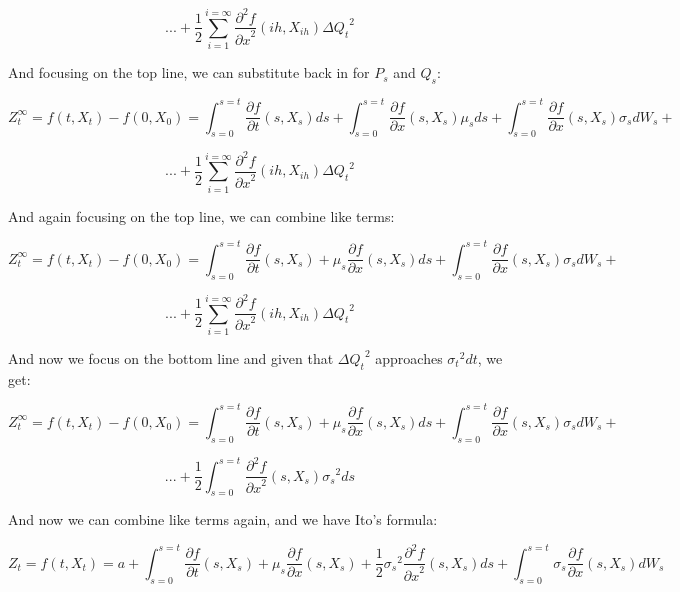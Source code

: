 \documentclass{article}
\begin{document}
$$...  +  \frac{1}{2}\sum_{i=1}^{i = \infty}\frac{\partial^2 f}{{\partial x}^2}(ih,X_{ih}){\Delta Q_t}^2 $$

And focusing on the top line, we can substitute back in for $P_s$ and $Q_s$:


$$Z_t^\infty = f(t,X_t) - f(0,X_0) = \int_{s=0}^{s=t} \frac{\partial f}{\partial t}(s,X_s) ds + \int_{s=0}^{s=t}\frac{\partial f}{\partial x}(s,X_s) \mu_s d s + \int_{s=0}^{s=t}\frac{\partial f}{\partial x}(s,X_s) \sigma_sdW_s +  $$


$$...  +  \frac{1}{2}\sum_{i=1}^{i = \infty}\frac{\partial^2 f}{{\partial x}^2}(ih,X_{ih}){\Delta Q_t}^2 $$

And again focusing on the top line, we can combine like terms:

$$Z_t^\infty = f(t,X_t) - f(0,X_0) = \int_{s=0}^{s=t} \frac{\partial f}{\partial t}(s,X_s) + \mu_s \frac{\partial f}{\partial x}(s,X_s)  ds + \int_{s=0}^{s=t}\frac{\partial f}{\partial x}(s,X_s) \sigma_sdW_s +  $$


$$...  +  \frac{1}{2}\sum_{i=1}^{i = \infty}\frac{\partial^2 f}{{\partial x}^2}(ih,X_{ih}){\Delta Q_t}^2 $$

And now we focus on the bottom line and given that ${\Delta Q_t}^2$ approaches ${\sigma _t}^2dt$, we get:


$$Z_t^\infty = f(t,X_t) - f(0,X_0) = \int_{s=0}^{s=t} \frac{\partial f}{\partial t}(s,X_s) + \mu_s \frac{\partial f}{\partial x}(s,X_s)  ds + \int_{s=0}^{s=t}\frac{\partial f}{\partial x}(s,X_s) \sigma_sdW_s +  $$


$$...  +  \frac{1}{2}\int_{s=0}^{s=t}\frac{\partial^2 f}{{\partial x}^2}(s,X_s) {\sigma _s}^2 ds $$

And now we can combine like terms again, and we have Ito's formula:


$$Z_t = f(t,X_t) = a + \int_{s=0}^{s=t} \frac{\partial f}{\partial t}(s,X_s) + \mu_s \frac{\partial f}{\partial x}(s,X_s) + \frac{1}{2}{\sigma _s}^2\frac{\partial^2 f}{{\partial x}^2}(s,X_s)  ds + \int_{s=0}^{s=t}\sigma_s\frac{\partial f}{\partial x}(s,X_s) dW_s   $$
\end{document}
